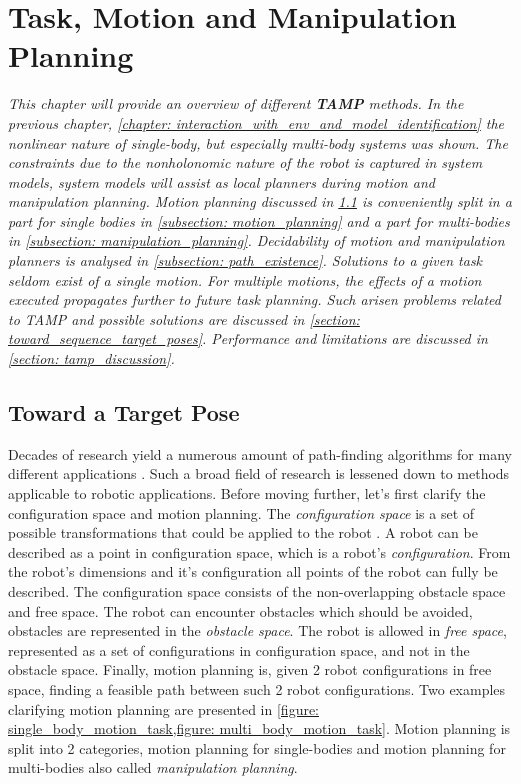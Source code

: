 \chapter{Task, Motion and Manipulation Planning}
\label{chapter: task_and_motion_planning}
\textit{
This chapter will provide an overview of different \textbf{\ac{TAMP}} methods. In the previous chapter, \cref{chapter: interaction_with_env_and_model_identification} the nonlinear nature of single-body, but especially multi-body systems was shown. The constraints due to the nonholonomic nature of the robot is captured in system models, system models will assist as local planners during motion and manipulation planning. Motion planning discussed in \cref{section: toward_target_pose} is conveniently split in a part for single bodies in \cref{subsection: motion_planning} and a part for multi-bodies in \cref{subsection: manipulation_planning}. Decidability of motion and manipulation planners is analysed in \cref{subsection: path_existence}. Solutions to a given task seldom exist of a single motion. For multiple motions, the effects of a motion executed propagates further to future task planning. Such arisen problems related to \ac{TAMP} and possible solutions are discussed in \cref{section: toward_sequence_target_poses}. Performance and limitations are discussed in \cref{section: tamp_discussion}.
}\\

\section{Toward a Target Pose}
\label{section: toward_target_pose}
Decades of research yield a numerous amount of path-finding algorithms for many different applications \cite{lavalle_planning_2006,karaman_sampling-based_2011}. Such a broad field of research is lessened down to methods applicable to robotic applications. Before moving further, let's first clarify the configuration space and motion planning. The  \textit{configuration space} is a set of possible transformations that could be applied to the robot \cite{lavalle_planning_2006}. A robot can be described as a point in configuration space, which is a robot's \textit{configuration}. From the robot's dimensions and it's configuration all points of the robot can fully be described. The configuration space consists of the non-overlapping obstacle space and free space. The robot can encounter obstacles which should be avoided, obstacles are represented in the \textit{obstacle space}. The robot is allowed in \textit{free space}, represented as a set of configurations in configuration space, and not in the obstacle space. Finally, motion planning is, given 2 robot configurations in free space, finding a feasible path between such 2 robot configurations. Two examples clarifying motion planning are presented in \cref{figure: single_body_motion_task,figure: multi_body_motion_task}. Motion planning is split into 2 categories, motion planning for single-bodies and motion planning for multi-bodies also called \textit{manipulation planning}. \\


